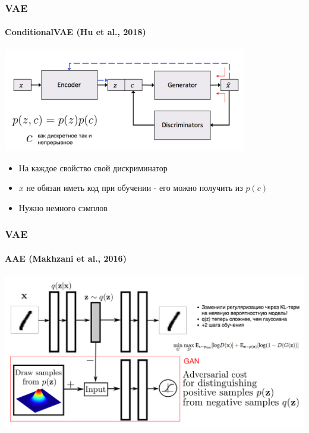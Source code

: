 \documentclass[10pt]{beamer}
\begin{document}
\begin{frame}
\frametitle{VAE}
\framesubtitle{ConditionalVAE (Hu et al., 2018)}

\begin{center}
    \includegraphics[width=0.8\textwidth]{images/cvae.png}
\end{center}
\begin{itemize}
    \item На каждое свойство свой дискриминатор
    \item $x$ не обязан иметь код при обучении - его можно получить из $p(c)$
    \item Нужно немного сэмплов
\end{itemize}

\end{frame}
\begin{frame}
\frametitle{VAE}
\framesubtitle{AAE (Makhzani et al., 2016)}

\includegraphics[width=\textwidth]{images/aae.png}

\end{frame}
\end{document}
